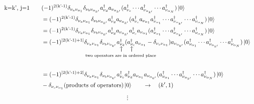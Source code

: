 \documentclass{article}
\makeatletter
\newcommand\vertarrowbox[2]{%
    \begin{array}[t]{@{}c@{}} #1 \\
    \rotatebox{90}{$\xrightarrow{\hphantom{a}}$} \\[-1ex]
    \mathclap{\scriptstyle\text{#2}}%
    \end{array}}
\makeatother
\begin{document}
\begin{align*}
    \text{k=k', j=1} \qquad &(-1)^{2(\text{k'-1})}\delta_{\nu_a \nu_{\alpha_1}}\delta_{\nu_b \nu_{\alpha_{k'}}} a^{\dagger}_{\nu_d} a_{\nu_{\alpha_{k'}}} (a^{\dagger}_{\nu_c} \cdots a^{\dagger}_{\nu_{\alpha_{k'}}}  \cdots a^{\dagger}_{\nu_{\alpha_N}})\ket{0}\\
    &= (-1)^{2(\text{k'-1})}\delta_{\nu_a \nu_{\alpha_1}}\delta_{\nu_b \nu_{\alpha_{k'}}} a^{\dagger}_{\nu_d} a_{\nu_{\alpha_{k'}}} (a^{\dagger}_{\nu_c} a_{\nu_{\alpha_1}} a^{\dagger}_{\nu_{\alpha_1}} \cdots a^{\dagger}_{\nu_{\alpha_{k'}}}  \cdots a^{\dagger}_{\nu_{\alpha_N}})\ket{0}\\
    &= (-1)^{2(\text{k'-1})}\delta_{\nu_a \nu_{\alpha_1}}\delta_{\nu_b \nu_{\alpha_{k'}}} a^{\dagger}_{\nu_d} a_{\nu_{\alpha_{k'}}} a^{\dagger}_{\nu_c} a_{\nu_{\alpha_1}} ( a^{\dagger}_{\nu_{\alpha_1}} \cdots a^{\dagger}_{\nu_{\alpha_{k'}}}  \cdots a^{\dagger}_{\nu_{\alpha_N}})\ket{0}\\
    &= (-1)^{|2(\text{k'-1})+1|}\delta_{\nu_a \nu_{\alpha_1}}\delta_{\nu_b \nu_{\alpha_{k'}}} \vertarrowbox{a^{\dagger}_{\nu_d}}{two operators are in ordered place} (\vertarrowbox{{a^{\dagger}_{\nu_c}}}{} a_{\nu_{\alpha_1}} - \delta_{\nu_c {\nu_{\alpha_1}}}) a_{\nu_{\alpha_{k'}}}( a^{\dagger}_{\nu_{\alpha_1}} \cdots a^{\dagger}_{\nu_{\alpha_{k'}}}  \cdots a^{\dagger}_{\nu_{\alpha_N}})\ket{0}\\
    &\\
    &= (-1)^{|2(\text{k'-1})+2|}\delta_{\nu_a \nu_{\alpha_1}}\delta_{\nu_b \nu_{\alpha_{k'}}} a^{\dagger}_{\nu_c} a^{\dagger}_{\nu_d} a_{\nu_{\alpha_1}} a_{\nu_{\alpha_{k'}}}( a^{\dagger}_{\nu_{\alpha_1}} \cdots a^{\dagger}_{\nu_{\alpha_{k'}}}  \cdots a^{\dagger}_{\nu_{\alpha_N}})\ket{0}\\ 
    & - \delta_{\nu_c {\nu_{\alpha_1}}}(\text{products of operators})\ket{0} \qquad \rightarrow \quad (k', 1)
\end{align*}
\begin{align*}
    \vdots
\end{align*}
\end{document}
